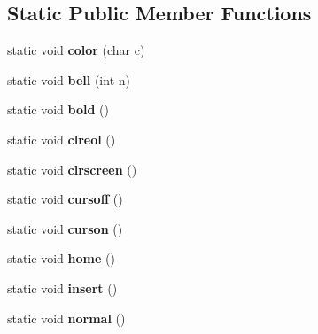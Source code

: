 \subsection*{Static Public Member Functions}
\begin{DoxyCompactItemize}
\item 
\hypertarget{classConsole_a1254fa9dfc22b645b18ff8beffb92ada}{
static void {\bfseries color} (char c)}
\label{classConsole_a1254fa9dfc22b645b18ff8beffb92ada}

\item 
\hypertarget{classConsole_afc3a9b51e05728d4805421579a87f8c1}{
static void {\bfseries bell} (int n)}
\label{classConsole_afc3a9b51e05728d4805421579a87f8c1}

\item 
\hypertarget{classConsole_a12fdea03e68fdec66289329fd34111c9}{
static void {\bfseries bold} ()}
\label{classConsole_a12fdea03e68fdec66289329fd34111c9}

\item 
\hypertarget{classConsole_a2ec015ca344b10710aa5cf2ff578e9fe}{
static void {\bfseries clreol} ()}
\label{classConsole_a2ec015ca344b10710aa5cf2ff578e9fe}

\item 
\hypertarget{classConsole_a24f860d3d5cb225b664c33b21f22cf8b}{
static void {\bfseries clrscreen} ()}
\label{classConsole_a24f860d3d5cb225b664c33b21f22cf8b}

\item 
\hypertarget{classConsole_ac28051c7f6cd8f4bcaf0a8b8338cbaa9}{
static void {\bfseries cursoff} ()}
\label{classConsole_ac28051c7f6cd8f4bcaf0a8b8338cbaa9}

\item 
\hypertarget{classConsole_accae861cddb51fde1c7a0000379270d1}{
static void {\bfseries curson} ()}
\label{classConsole_accae861cddb51fde1c7a0000379270d1}

\item 
\hypertarget{classConsole_ac6353601b974fc3d40ab4d1b29052f00}{
static void {\bfseries home} ()}
\label{classConsole_ac6353601b974fc3d40ab4d1b29052f00}

\item 
\hypertarget{classConsole_ab9f1622719fd6006b5f23a25dc148109}{
static void {\bfseries insert} ()}
\label{classConsole_ab9f1622719fd6006b5f23a25dc148109}

\item 
\hypertarget{classConsole_a0af50381e547a4ad90b0fc5d82d3d9c0}{
static void {\bfseries normal} ()}
\label{classConsole_a0af50381e547a4ad90b0fc5d82d3d9c0}


\end{DoxyCompactItemize}
